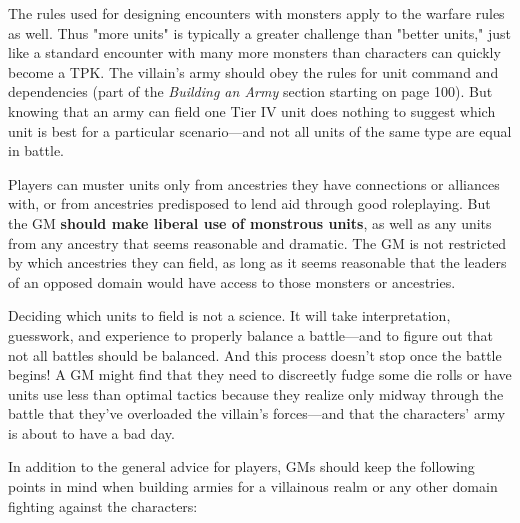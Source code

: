 \documentclass[10pt,a4paper,twoside,bg=print,twocolumn,openany,nodeprecatedcode]{dndbook}
\begin{document}
The rules used for designing encounters with monsters apply to the warfare rules as well. Thus "more units" is typically a greater challenge than "better units," just like a standard encounter with many more monsters than characters can quickly become a TPK. The villain's army should obey the rules for unit command and dependencies (part of the \textit{Building an Army} section starting on page 100). But knowing that an army can field one Tier IV unit does nothing to suggest which unit is best for a particular scenario—and not all units of the same type are equal in battle.

Players can muster units only from ancestries they have connections or alliances with, or from ancestries predisposed to lend aid through good roleplaying. But the GM \textbf{should make liberal use of monstrous units}, as well as any units from any ancestry that seems reasonable and dramatic. The GM is not restricted by which ancestries they can field, as long as it seems reasonable that the leaders of an opposed domain would have access to those monsters or ancestries.

Deciding which units to field is not a science. It will take interpretation, guesswork, and experience to properly balance a battle—and to figure out that not all battles should be balanced. And this process doesn't stop once the battle begins! A GM might find that they need to discreetly fudge some die rolls or have units use less than optimal tactics because they realize only midway through the battle that they've overloaded the villain's forces—and that the characters' army is about to have a bad day.

In addition to the general advice for players, GMs should keep the following points in mind when building armies for a villainous realm or any other domain fighting against the characters:
\end{document}
